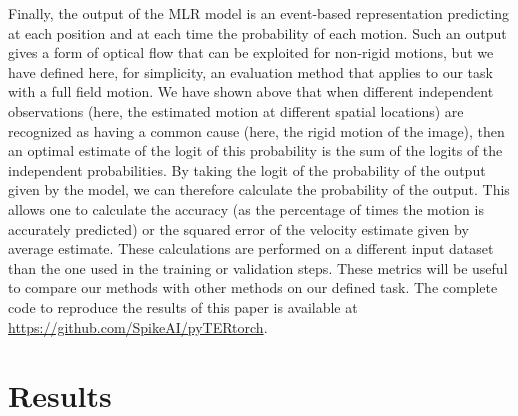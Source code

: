 \documentclass[default]{sn-jnl}%
\theoremstyle{thmstyleone}%
\theoremstyle{thmstyletwo}%
\theoremstyle{thmstylethree}%
\begin{document}
%
Finally, the output of the MLR model is an event-based representation predicting at each position and at each time the probability of each motion. Such an output gives a form of optical flow that can be exploited for non-rigid motions, but we have defined here, for simplicity, an evaluation method that applies to our task with a full field motion. We have shown above that when different independent observations (here, the estimated motion at different spatial locations) are recognized as having a common cause (here, the rigid motion of the image), then an optimal estimate of the logit of this probability is the sum of the logits of the independent probabilities. By taking the logit of the probability of the output given by the model, we can therefore calculate the probability of the output. This allows one to calculate the accuracy (as the percentage of times the motion is accurately predicted) or the squared error%
of the velocity estimate given by average estimate. 
These calculations are performed on a different input dataset than the one used in the training or validation steps. These metrics will be useful to compare our methods with other methods on our defined task.  The complete code to reproduce the results of this paper is available at \url{https://github.com/SpikeAI/pyTERtorch}.  
%
\section{Results}
\label{sec:results}
\end{document}
